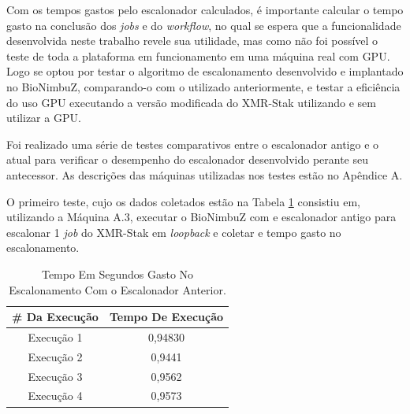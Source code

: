 Com os tempos gastos pelo escalonador calculados, é importante calcular o tempo gasto na conclusão dos \textit{jobs} e do \textit{workflow}, no qual se espera que a funcionalidade desenvolvida neste trabalho revele sua utilidade, mas como não foi possível o teste de toda a plataforma em funcionamento em uma máquina real com \acrshort{GPU}. Logo se optou por testar o algoritmo de escalonamento desenvolvido e implantado no BioNimbuZ, comparando-o com o utilizado anteriormente, e testar a eficiência do uso GPU executando a versão modificada do XMR-Stak utilizando e sem utilizar a \acrshort{GPU}.


Foi realizado uma série de testes comparativos entre o escalonador antigo e o atual para verificar o desempenho do escalonador desenvolvido perante seu antecessor. As descrições das máquinas utilizadas nos testes estão no Apêndice A.  %

O primeiro teste, cujo os dados coletados estão na Tabela \ref{TabelaTempoEscalonadorAntigo} consistiu em, utilizando a Máquina A.3, executar o BioNimbuZ com e escalonador antigo para escalonar 1 \textit{job} do XMR-Stak em \textit{loopback} e coletar e tempo gasto no escalonamento.

\begin {table}[H]
\begin{center}
	\begin{tabular}{ |c|c| } 
		\hline
		\#  Da Execução & Tempo De Execução \\ 
		\hline
		Execução 1 & 0,94830 \\ 
		\hline
		Execução 2 & 0,9441 \\ 
		\hline
		Execução 3 & 0,9562 \\ 
		\hline
		Execução 4 & 0,9573 \\ 
		\hline
	\end{tabular}
	\caption {Tempo Em Segundos Gasto No Escalonamento Com o Escalonador Anterior.} \label{TabelaTempoEscalonadorAntigo} 
\end{center}
\end {table}

